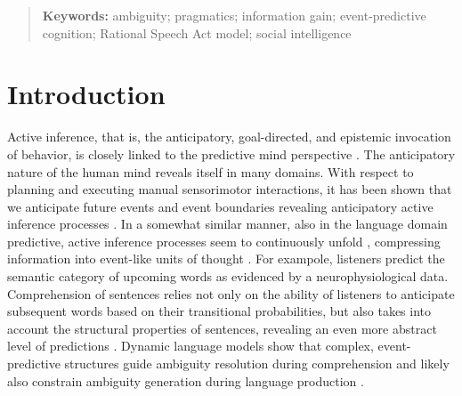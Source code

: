 \documentclass[10pt,a4paper]{article}
\begin{document}
\begin{abstract}

\textbf{Keywords:} 
ambiguity; pragmatics; information gain; event-predictive cognition; Rational Speech Act model; social intelligence
\end{abstract}



\section{Introduction}

Active inference, that is, the anticipatory, goal-directed, and epistemic invocation of behavior, is
closely linked to the predictive mind perspective \cite{Friston:2015,Hohwy:2013,Clark:2016}. 
The anticipatory nature of the human mind reveals itself in many domains.
With respect to planning and executing manual sensorimotor interactions, 
it has been shown that we anticipate future events and event boundaries revealing anticipatory active inference processes \cite{belardinelli2016s, belardinelli2018mental,Friston:2015,Hayhoe:2003,lohmann2019hands}.
In a somewhat similar manner, also in the language domain predictive, active inference processes seem to continuously unfold \cite{Christiansen:2016}, compressing information into event-like units of thought \cite{Gaerdenfors:2014}.
For exampole, listeners predict the semantic category of upcoming words \cite{federmeier2002picture} as evidenced by a neurophysiological data.
Comprehension of sentences relies not only on the ability of listeners to anticipate subsequent words based on their transitional probabilities, but also takes into account the structural properties of sentences, revealing an even more abstract level of predictions \cite{levy2008expectation}.
Dynamic language models show that complex, event-predictive structures guide ambiguity resolution during comprehension and likely also constrain ambiguity generation during language production \cite{Elman:2019}. 
\end{document}
